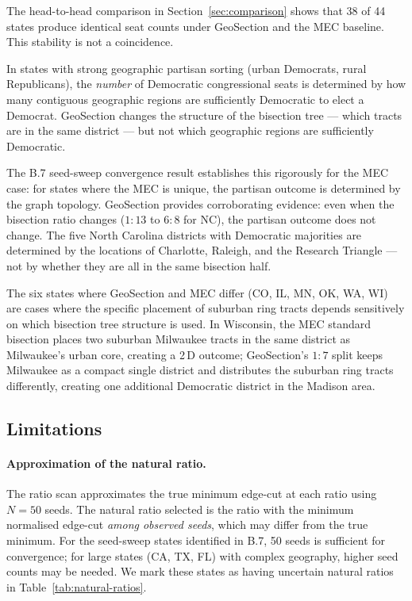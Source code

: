 The head-to-head comparison in Section~\ref{sec:comparison} shows that
38 of 44 states produce identical seat counts under GeoSection and the
MEC baseline.
This stability is not a coincidence.

In states with strong geographic partisan sorting (urban Democrats, rural
Republicans), the \emph{number} of Democratic congressional seats is
determined by how many contiguous geographic regions are sufficiently
Democratic to elect a Democrat.
GeoSection changes the structure of the bisection tree --- which tracts
are in the same district --- but not which geographic regions are
sufficiently Democratic.

The B.7 seed-sweep convergence result establishes this rigorously for
the MEC case: for states where the MEC is unique, the partisan outcome
is determined by the graph topology.
GeoSection provides corroborating evidence: even when the bisection ratio
changes ($1:13$ to $6:8$ for NC), the partisan outcome does not change.
The five North Carolina districts with Democratic majorities are determined
by the locations of Charlotte, Raleigh, and the Research Triangle ---
not by whether they are all in the same bisection half.

The six states where GeoSection and MEC differ (CO, IL, MN, OK, WA, WI)
are cases where the specific placement of suburban ring tracts depends
sensitively on which bisection tree structure is used.
In Wisconsin, the MEC standard bisection places two suburban Milwaukee
tracts in the same district as Milwaukee's urban core, creating a 2\,D
outcome; GeoSection's $1:7$ split keeps Milwaukee as a compact single
district and distributes the suburban ring tracts differently, creating
one additional Democratic district in the Madison area.

\subsection{Limitations}
\label{sec:limitations}

\paragraph{Approximation of the natural ratio.}
The ratio scan approximates the true minimum edge-cut at each ratio using
$N=50$ seeds.
The natural ratio selected is the ratio with the minimum normalised edge-cut
\emph{among observed seeds}, which may differ from the true minimum.
For the seed-sweep states identified in B.7, 50 seeds is sufficient for
convergence; for large states (CA, TX, FL) with complex geography, higher
seed counts may be needed.
We mark these states as having uncertain natural ratios in Table~\ref{tab:natural-ratios}.

